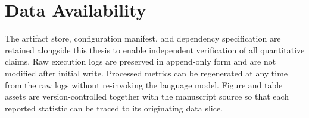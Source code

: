 \section{Data Availability}
\label{sec:repro:data}

The artifact store, configuration manifest, and dependency specification are
retained alongside this thesis to enable independent verification of all
quantitative claims.  Raw execution logs are preserved in append-only form and
are not modified after initial write.  Processed metrics can be regenerated at
any time from the raw logs without re-invoking the language model.  Figure and
table assets are version-controlled together with the manuscript source so that
each reported statistic can be traced to its originating data slice.
